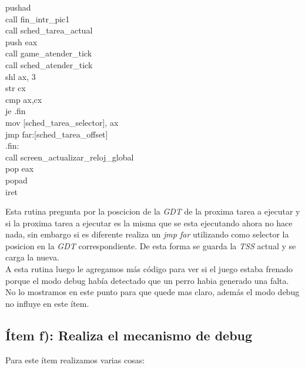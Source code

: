 \begin{center}

    pushad \\    
    call fin\_intr\_pic1 \\
    call sched\_tarea\_actual \\
    push eax    \\
    call game\_atender\_tick \\           
    call sched\_atender\_tick \\

    shl ax, 3  \\
    str cx \\
    cmp ax,cx \\
    je .fin \\

    mov [sched\_tarea\_selector], ax \\
    jmp far:[sched\_tarea\_offset] \\

    .fin: \\
     call screen\_actualizar\_reloj\_global \\    
    pop eax \\
    popad \\
    iret \\

\end{center}

Esta rutina pregunta por la poscicion de la \textit{GDT}  de la proxima tarea a ejecutar y si la proxima tarea a ejecutar es la misma que se esta ejecutando ahora no hace nada, sin embargo si es diferente realiza un \textit{jmp far} utilizando como selector la posicion en la \textit{GDT} correspondiente. De esta forma se  guarda la \textit{TSS} actual y se carga la nueva. \\

A esta rutina luego le agregamos más código para ver si el juego estaba frenado porque el modo debug había detectado que un perro habia generado una falta. No lo mostramos en este punto para que quede mas claro, además el modo debug no influye en este ítem.

\subsection{Ítem f):  Realiza el mecanismo de debug}

Para este ítem realizamos varias cosas:

